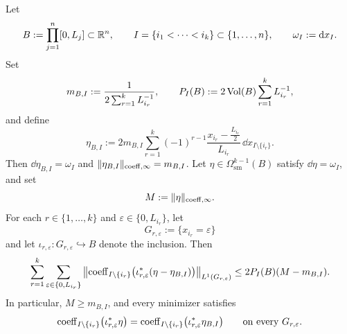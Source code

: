 \begin{theorem}
\label{thm:sliced-active-readout}
Let
\[
B:=\prod_{j=1}^n [0,L_j]\subset\mathbb{R}^n,
\qquad
I=\{i_1<\cdots<i_k\}\subset\{1,\dots,n\},
\qquad
\omega_I:=\mathrm{d} x_I.
\]
Set
\[
m_{B,I}:=\frac{1}{2\sum_{r=1}^k L_{i_r}^{-1}},
\qquad
P_I(B):=2\operatorname{Vol}(B)\sum_{r=1}^k L_{i_r}^{-1},
\]
and define
\begin{equation}
\label{eq:sliced-explicit-minimizer}
\eta_{B,I}
:=
2m_{B,I}\sum_{r=1}^k (-1)^{r-1}
\frac{x_{i_r}-\frac{L_{i_r}}{2}}{L_{i_r}}\,
\dd x_{I\setminus\{i_r\}}.
\end{equation}
Then $\dd\eta_{B,I}=\omega_I$ and
$\lVert \eta_{B,I} \rVert_{\mathrm{coeff},\infty}=m_{B,I}$. Let
$\eta\in\Omega^{k-1}_{\mathrm{sm}}(B)$ satisfy $\dd\eta=\omega_I$, and set
\[
M:=\lVert \eta \rVert_{\mathrm{coeff},\infty}.
\]
For each $r\in\{1,\dots,k\}$ and $\varepsilon\in\{0,L_{i_r}\}$, let
\[
G_{r,\varepsilon}:=\{x_{i_r}=\varepsilon\}
\]
and let $\iota_{r,\varepsilon}:G_{r,\varepsilon}\hookrightarrow B$ denote the
inclusion. Then
\begin{equation}
\label{eq:sliced-boundary-stability}
\sum_{r=1}^k\sum_{\varepsilon\in\{0,L_{i_r}\}}
\left\|
\mathrm{coeff}_{I\setminus\{i_r\}}
\bigl(
\iota_{r,\varepsilon}^\ast(\eta-\eta_{B,I})
\bigr)
\right\|_{L^1(G_{r,\varepsilon})}
\le
2P_I(B)(M-m_{B,I}).
\end{equation}
In particular, $M\ge m_{B,I}$, and every minimizer satisfies
\[
\mathrm{coeff}_{I\setminus\{i_r\}}
\bigl(
\iota_{r,\varepsilon}^\ast\eta
\bigr)
=
\mathrm{coeff}_{I\setminus\{i_r\}}
\bigl(
\iota_{r,\varepsilon}^\ast\eta_{B,I}
\bigr)
\qquad
\text{on every }G_{r,\varepsilon}.
\]
\end{theorem}

